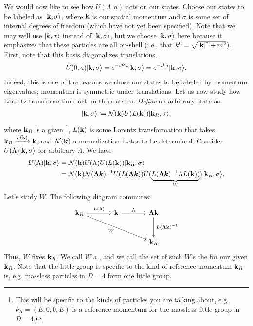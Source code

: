 \documentclass[11pt]{article}
\begin{document}
We would now like to see how $U(\Lambda, a)$ acts on our states.
Choose our states to be labeled as $\lvert\mathbf{k}, \sigma\rangle$, where
$\mathbf{k}$ is our spatial momentum and $\sigma$ is some set of internal
degrees of freedom (which have not yet been specified). Note that
we may well use $\lvert k, \sigma\rangle$ instead of $\lvert\mathbf{k}, \sigma\rangle$,
but we choose $\lvert\mathbf{k}, \sigma\rangle$ here because it emphasizes that these
particles are all on-shell (i.e., that $k^0 = \sqrt{|\mathbf{k}|^2 + m^2}$).
First, note that this basis diagonalizes translations,
\begin{align*}
    U(0, a) \lvert\mathbf{k}, \sigma\rangle = e^{- i \mathcal{P} a} \lvert\mathbf{k}, \sigma\rangle = e^{-i k a} \lvert\mathbf{k}, \sigma\rangle.
\end{align*}
Indeed, this is one of the reasons we chose our states to be labeled
by momentum eigenvalues; momentum is symmetric under translations. Let us
now study how Lorentz transformations act on these states. \emph{Define} an 
arbitrary state as
\begin{align*}
    \lvert\mathbf{k}, \sigma\rangle \coloneqq \mathcal{N}(\mathbf{k}) U(L(\mathbf{k})) \lvert\mathbf{k}_R, \sigma\rangle,
\end{align*}
where $\mathbf{k}_R$ is a given \footnote{This will
be specific to the kinds of particles you are talking about, e.g.
$k_R = (E, 0, 0, E)$ is a reference momentum for the massless little
group in $D = 4$.}, $L(\mathbf{k})$ is some Lorentz transformation 
that takes $\mathbf{k}_R \xrightarrow{L(\mathbf{k})} \mathbf{k}$, and $\mathcal{N}(\mathbf{k})$
a normalization factor to be determined. Consider $U(\Lambda) \lvert\mathbf{k}, \sigma\rangle$
for arbitrary $\Lambda$. We have
\begin{align*}
    U(\Lambda) \lvert\mathbf{k}, \sigma\rangle & = \mathcal{N}(\mathbf{k}) U(\Lambda) U(L(\mathbf{k})) \lvert\mathbf{k}_R, \sigma\rangle\\
    & = \mathcal{N}(\mathbf{k}) \mathcal{N}(\boldsymbol{\Lambda k})^{-1} U(L(\boldsymbol{\Lambda k})) U(\underbrace{L(\boldsymbol{\Lambda k})^{-1} \Lambda L(\mathbf{k}))}_{W}) \lvert\mathbf{k}_R, \sigma\rangle.
\end{align*}
Let's study $W$. The following diagram commutes:
\[
    \begin{tikzcd}[column sep=large, row sep=large]
    \bfk_R \arrow[r, "\,L(\bfk)\,"] \arrow[rrd, "\,W\,"'] & \bfk \arrow[r, "\,\Lambda\,"] & \boldsymbol{\Lambda \bfk} \arrow[d, "\,L(\boldsymbol{\Lambda \bfk})^{-1}\,"] \\
    & & \bfk_R
    \end{tikzcd}
\]
Thus, $W$ fixes $\mathbf{k}_R$. We call $W$ a ,
and we call the set of such $W$'s the  for
our given $\mathbf{k}_R$. Note that the little group is specific
to the kind of reference momentum $\mathbf{k}_R$ is, e.g. massless
particles in $D = 4$ form one little group. 
\end{document}
